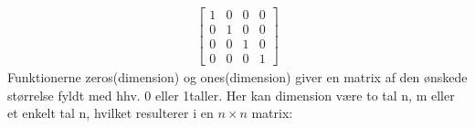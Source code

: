 \documentclass[letterpaper,10pt,english]{jupyterBook}
\begin{document}
\begin{sphinxVerbatim}[commandchars=\\\{\}]
   

  
\end{sphinxVerbatim}
\begin{equation*}
\begin{split}\displaystyle \left[\begin{matrix}1 & 0 & 0 & 0\\0 & 1 & 0 & 0\\0 & 0 & 1 & 0\\0 & 0 & 0 & 1\end{matrix}\right]\end{split}
\end{equation*}
 Funktionerne zeros(dimension) og ones(dimension) giver en matrix af den ønskede størrelse fyldt med hhv. 0 eller 1\sphinxhyphen{}taller. Her kan dimension være to tal n, m eller et enkelt tal n, hvilket resulterer i en \(n \times n\) matrix:
\end{document}
